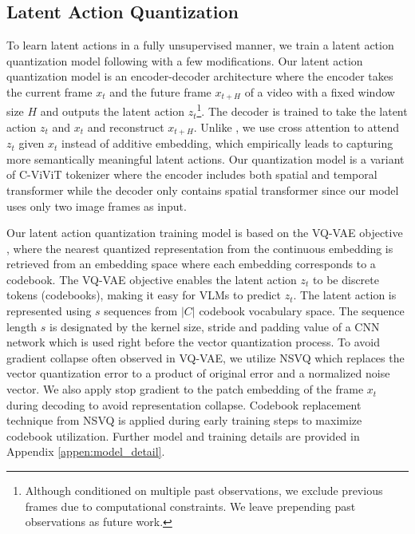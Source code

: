 \documentclass{article} %
\begin{document}
\subsection{Latent Action Quantization}
To learn latent actions in a fully unsupervised manner, we train a latent action quantization model following \citet{bruce2024genie} with a few modifications. Our latent action quantization model is an encoder-decoder architecture where the encoder takes the current frame $x_t$ and the future frame $x_{t+H}$ of a video with a fixed window size $H$ and outputs the latent action $z_t$\footnote{Although \citet{bruce2024genie} conditioned on multiple past observations, we exclude previous frames due to computational constraints. We leave prepending past observations as future work.}. The decoder is trained to take the latent action $z_t$ and $x_t$ and reconstruct $x_{t+H}$. Unlike \citet{bruce2024genie}, we use cross attention to attend $z_t$ given $x_t$ instead of additive embedding, which empirically leads to capturing more semantically meaningful latent actions. Our quantization model is a variant of C-ViViT tokenizer \citep{villegas2023phenaki} where the encoder includes both spatial and temporal transformer while the decoder only contains spatial transformer since our model uses only two image frames as input. 

Our latent action quantization training model is based on the VQ-VAE objective \citep{NIPS2017_7a98af17}, {where the nearest quantized representation from the continuous embedding is retrieved from an embedding space where each embedding corresponds to a codebook.} The VQ-VAE objective enables the latent action $z_t$ to be discrete tokens (codebooks), making it easy for VLMs to predict $z_t$. The latent action is represented using $s$ sequences from $|C|$ codebook vocabulary space. {The sequence length $s$ is designated by the kernel size, stride and padding value of a CNN network which is used right before the vector quantization process.} To avoid gradient collapse often observed in VQ-VAE, we utilize NSVQ \citep{9696322} which replaces the vector quantization error to a product of original error and a normalized noise vector. {We also apply stop gradient to the patch embedding of the frame $x_t$ during decoding to avoid representation collapse.} Codebook replacement technique from NSVQ is applied during early training steps to maximize codebook utilization. {Further model and training details are provided in Appendix \ref{appen:model_detail}}.
\end{document}
